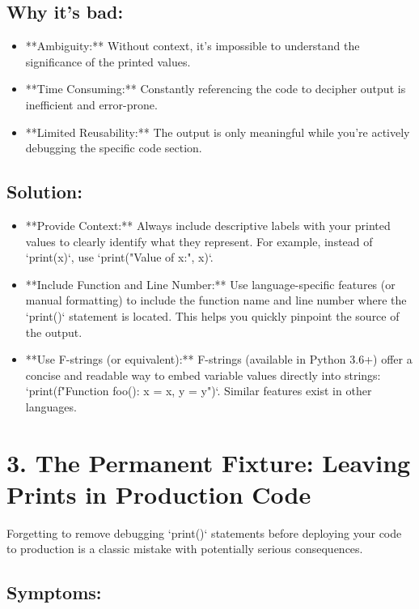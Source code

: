 \documentclass{article}
\begin{document}
\subsection*{Why it's bad:}

\begin{itemize}
    \item **Ambiguity:**  Without context, it's impossible to understand the significance of the printed values.
    \item **Time Consuming:**  Constantly referencing the code to decipher output is inefficient and error-prone.
    \item **Limited Reusability:**  The output is only meaningful while you're actively debugging the specific code section.
\end{itemize}

\subsection*{Solution:}

\begin{itemize}
    \item **Provide Context:** Always include descriptive labels with your printed values to clearly identify what they represent. For example, instead of `print(x)`, use `print("Value of x:", x)`.
    \item **Include Function and Line Number:**  Use language-specific features (or manual formatting) to include the function name and line number where the `print()` statement is located.  This helps you quickly pinpoint the source of the output.
    \item **Use F-strings (or equivalent):** F-strings (available in Python 3.6+) offer a concise and readable way to embed variable values directly into strings: `print(f"Function foo(): x = {x}, y = {y}")`.  Similar features exist in other languages.
\end{itemize}

\section*{3. The Permanent Fixture: Leaving Prints in Production Code}

Forgetting to remove debugging `print()` statements before deploying your code to production is a classic mistake with potentially serious consequences.

\subsection*{Symptoms:}
\end{document}

